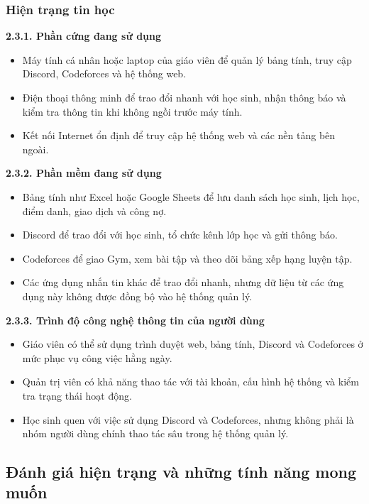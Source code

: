 \documentclass[12pt,a4paper]{article}
\begin{document}
\subsubsection{Hiện trạng tin học}

\textbf{2.3.1. Phần cứng đang sử dụng}

\begin{itemize}[leftmargin=*]
    \item Máy tính cá nhân hoặc laptop của giáo viên để quản lý bảng tính, truy
    cập Discord, Codeforces và hệ thống web.
    \item Điện thoại thông minh để trao đổi nhanh với học sinh, nhận thông báo
    và kiểm tra thông tin khi không ngồi trước máy tính.
    \item Kết nối Internet ổn định để truy cập hệ thống web và các nền tảng bên
    ngoài.
\end{itemize}

\textbf{2.3.2. Phần mềm đang sử dụng}

\begin{itemize}[leftmargin=*]
    \item Bảng tính như Excel hoặc Google Sheets để lưu danh sách học sinh, lịch
    học, điểm danh, giao dịch và công nợ.
    \item Discord để trao đổi với học sinh, tổ chức kênh lớp học và gửi thông
    báo.
    \item Codeforces để giao Gym, xem bài tập và theo dõi bảng xếp hạng luyện
    tập.
    \item Các ứng dụng nhắn tin khác để trao đổi nhanh, nhưng dữ liệu từ các ứng
    dụng này không được đồng bộ vào hệ thống quản lý.
\end{itemize}

\textbf{2.3.3. Trình độ công nghệ thông tin của người dùng}

\begin{itemize}[leftmargin=*]
    \item Giáo viên có thể sử dụng trình duyệt web, bảng tính, Discord và
    Codeforces ở mức phục vụ công việc hằng ngày.
    \item Quản trị viên có khả năng thao tác với tài khoản, cấu hình hệ thống và
    kiểm tra trạng thái hoạt động.
    \item Học sinh quen với việc sử dụng Discord và Codeforces, nhưng không phải
    là nhóm người dùng chính thao tác sâu trong hệ thống quản lý.
\end{itemize}

\subsection{Đánh giá hiện trạng và những tính năng mong muốn}
\end{document}
